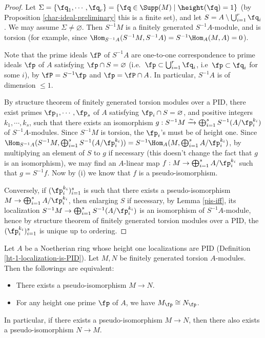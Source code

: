 \begin{proof}
Let
$\Sigma=\{\fq_1,\cdots,\fq_r\}=\{\fq\in\Supp(M)\mid\height(\fq)=1\}$
(by Proposition \ref{char-ideal-preliminary} this is a finite set),
and let $S=A\setminus\bigcup_{i=1}^r\fq_i$.
We may assume $\Sigma\neq\varnothing$.
Then $S^{-1}M$ is a finitely generated $S^{-1}A$-module,
and is torsion (for example, since $\Hom_{S^{-1}A}(S^{-1}M,S^{-1}A)
=S^{-1}\Hom_A(M,A)=0$).

Note that the prime ideals $\fP$ of $S^{-1}A$ are one-to-one correspondence
to prime ideals $\fp$ of $A$ satisfying $\fp\cap S=\varnothing$
(i.e.~$\fp\subset\bigcup_{i=1}^r\fq_i$, i.e~$\fp\subset\fq_i$ for some $i$),
by $\fP=S^{-1}\fp$ and $\fp=\fP\cap A$.
In particular, $S^{-1}A$ is of dimension $\leq 1$.

By structure theorem of finitely generated torsion modules over a PID,
there exist primes $\fp_1,\cdots,\fp_s$ of $A$
satisfying $\fp_i\cap S=\varnothing$,
and positive integers $k_1,\cdots,k_s$, such that
there exists an isomorphism
$g:S^{-1}M\xrightarrow\sim\bigoplus_{i=1}^sS^{-1}(A/\fp_i^{k_i})$
of $S^{-1}A$-modules.
Since $S^{-1}M$ is torsion, the $\fp_i$'s must be of height one.
Since $\Hom_{S^{-1}A}(S^{-1}M,\bigoplus_{i=1}^sS^{-1}(A/\fp_i^{k_i}))
=S^{-1}\Hom_A(M,\bigoplus_{i=1}^sA/\fp_i^{k_i})$,
by multiplying an element of $S$ to $g$ if necessary
(this doesn't change the fact that $g$ is an isomorphism), we may find
an $A$-linear map $f:M\to\bigoplus_{i=1}^sA/\fp_i^{k_i}$
such that $g=S^{-1}f$.
Now by (i) we know that $f$ is a pseudo-isomorphism.

Conversely, if $(\fp_i^{k_i})_{i=1}^s$ is such that there exists a
pseudo-isomorphism
$M\to\bigoplus_{i=1}^s A/\fp_i^{k_i}$,
then enlarging $S$ if necessary, by Lemma \ref{pis-iff},
its localization
$S^{-1}M\to\bigoplus_{i=1}^sS^{-1}(A/\fp_i^{k_i})$
is an isomorphism of $S^{-1}A$-module, hence by
structure theorem of finitely generated torsion modules over a PID,
the $(\fp_i^{k_i})_{i=1}^s$ is unique up to ordering.
\end{proof}

\begin{prop}
\label{pis-symm}
\leanok
Let $A$ be a Noetherian ring whose height one localizations are PID
(Definition \ref{ht-1-localization-is-PID}).
Let $M,N$ be finitely generated torsion $A$-modules.
Then the followings are equivalent:
\begin{itemize}
\item[(a)]
There exists a pseudo-isomorphism $M\to N$.
\item[(b)]
For any height one prime $\fp$ of $A$, we have $M_\fp\cong N_\fp$.
\end{itemize}
In particular, if there exists a pseudo-isomorphism $M\to N$,
then there also exists a pseudo-isomorphism $N\to M$.
\end{prop}

